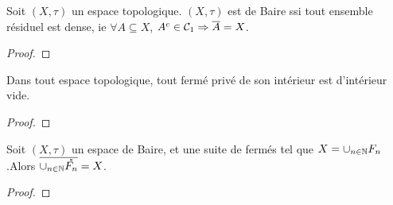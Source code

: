 \begin{proposition}
	Soit $(X, \tau)$ un espace topologique.
	$(X, \tau)$ est de Baire ssi tout ensemble résiduel est dense, ie $\forall A
	\subseteq X$, $A^{c} \in \mathcal{C}_{1} \Rightarrow \overline{A} = X$.
\end{proposition}

\begin{proof}
	
\end{proof}

\begin{proposition}
	Dans tout espace topologique, tout fermé privé de son intérieur est
	d'intérieur vide.
\end{proposition}

\begin{proof}
	
\end{proof}

 \begin{proposition}
	Soit $(X, \tau)$ un espace de Baire, et  une
	suite de fermés tel que $X = \displaystyle\cup_{n \in \mathbb{N}}F_{n}$.Alors
	$\displaystyle\overline{\cup_{n \in \mathbb{N}}\mathring{F_{n}}} = X$.
\end{proposition}

\begin{proof}
	
\end{proof}
